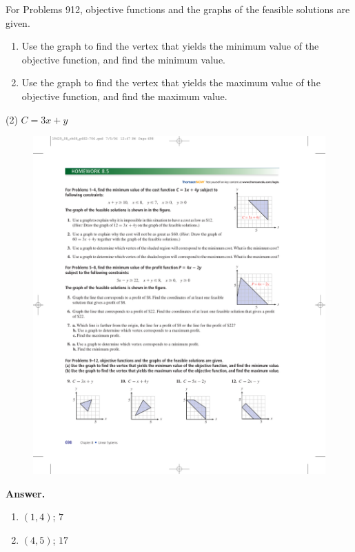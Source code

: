 \documentclass[10pt,]{book}
\theoremstyle{plain}
\theoremstyle{definition}
\theoremstyle{definition}
\theoremstyle{definition}
\numberwithin{equation}{part}
\begin{document}
\par\smallskip\noindent
\hypertarget{exercisegroup-3}{}\par\noindent For Problems 9\textendash{}12, objective functions and the graphs of the feasible solutions are given. \leavevmode%
\begin{enumerate}[label=\alph*]
\item\hypertarget{li-60}{}Use the graph to find the vertex that yields the minimum value of the objective function, and find the minimum value.%
\item\hypertarget{li-61}{}Use the graph to find the vertex that yields the maximum value of the objective function, and find the maximum value.%
\end{enumerate}
%
\begin{exercisegroup}(2)
\exercise[9.]\hypertarget{exercise-13}{}\(C = 3x + y\)\leavevmode%
\begin{figure}
\centering
\includegraphics[width=0.7\linewidth]{images/fig-8-5-9}
\end{figure}
%
\par\smallskip
\noindent\textbf{Answer.}\hypertarget{answer-9}{}\quad
\leavevmode%
\begin{multicols}{2}
\begin{enumerate}[label=(\alph*)]
\item\hypertarget{li-62}{}\((1,4) \); \(7\)%
\item\hypertarget{li-63}{}\((4,5) \); \(17\)%
\end{enumerate}
\end{multicols}

\end{exercisegroup}
\end{document}
